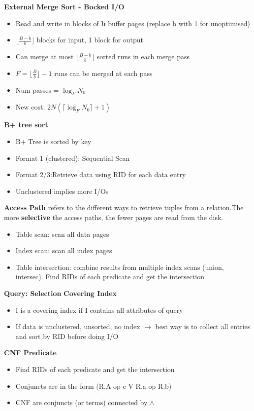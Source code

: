 \documentclass[10pt, landscape]{article}
\newcommand{\floor}[1]{\lfloor #1 \rfloor}
\newcommand{\ceil}[1]{\lceil #1 \rceil}
\begin{document}
\begin{multicols}{4}
\textbf{External Merge Sort - Bocked I/O}
\begin{itemize}
  \item Read and write in blocks of \textbf{b} buffer pages (replace b with 1 for unoptimised)
  \item $\floor{\frac{B-b}{b}}$ blocks for input, 1 block for output
  \item Can merge at most $\floor{\frac{B-b}{b}}$ sorted runs in each merge pass
  \item $F=\floor{\frac{B}{b}} - 1$ runs can be merged at each pass
  \item Num passes = $\log_{F} N_0$
  \item New cost: $2N(\ceil{\log_{F} N_0} + 1)$
\end{itemize}

\textbf{B+ tree sort}
\begin{itemize}
  \item B+ Tree is sorted by key
  \item Format 1 (clustered): Sequential Scan 
  \item Format 2/3:Retrieve data using RID for each data entry 
  \item Unclustered implies more I/Os
\end{itemize}

\textbf{Access Path} refers to the different ways to retrieve tuples from a relation.The more \textbf{selective} the access paths, the fewer pages are read from the disk.
\begin{itemize}
  \item Table scan: scan all data pages 
  \item Index scan: scan all index pages 
  \item Table intersection: combine results from multiple index scans (union, intersec). Find RIDs of each predicate and get the intersection
\end{itemize}

\textbf{Query: Selection}
\textbf{Covering Index}
\begin{itemize}
  \item I is a covering index if I contains all attributes of query
  \item If data is unclustered, unsorted, no index $\rightarrow$ best way is to collect all entries and sort by RID before doing I/O 
\end{itemize}

\textbf{CNF Predicate}
\begin{itemize}
  \item Find RIDs of each predicate and get the intersection
  \item Conjuncts are in the form (R.A op c V R.a op R.b) 
  \item CNF are conjuncts (or terms) connected by $\land$ 
\end{itemize}


\end{multicols}
\end{document}
